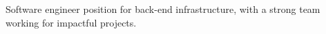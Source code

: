 
\paragraphstyle

Software engineer position for back-end infrastructure, with a strong team
working for impactful projects.

